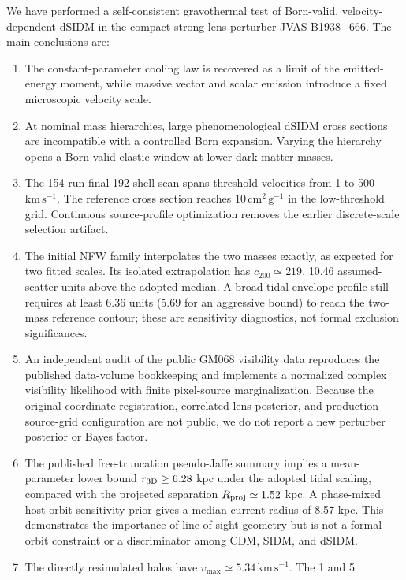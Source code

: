 \documentclass[12pt]{article}
\begin{document}
We have performed a self-consistent gravothermal test of Born-valid,
velocity-dependent dSIDM in the compact strong-lens perturber JVAS
B1938+666.  The main conclusions are:
\begin{enumerate}
  \item The constant-parameter cooling law is recovered as a limit of the
  emitted-energy moment, while massive vector and scalar emission introduce
  a fixed microscopic velocity scale.
  \item At nominal mass hierarchies, large phenomenological dSIDM cross
  sections are incompatible with a controlled Born expansion.  Varying the
  hierarchy opens a Born-valid elastic window at lower dark-matter masses.
  \item The 154-run final 192-shell scan spans threshold velocities from 1 to
  500 $\mathrm{km\,s^{-1}}$.  The reference cross section reaches
  $10\,\mathrm{cm^2\,g^{-1}}$ in the low-threshold grid.  Continuous
  source-profile optimization removes the earlier discrete-scale selection
  artifact.
  \item The initial NFW family interpolates the two masses exactly, as expected
  for two fitted scales.  Its isolated extrapolation has $c_{200}\simeq219$,
  10.46 assumed-scatter units above the adopted median.  A broad tidal-envelope
  profile still requires at least 6.36 units (5.69 for an aggressive bound) to
  reach the two-mass reference contour; these are sensitivity diagnostics,
  not formal exclusion significances.
  \item An independent audit of the public GM068 visibility data reproduces
  the published data-volume bookkeeping and implements a normalized complex
  visibility likelihood with finite pixel-source marginalization.  Because
  the original coordinate registration, correlated lens posterior, and
  production source-grid configuration are not public, we do not report a new
  perturber posterior or Bayes factor.
  \item The published free-truncation pseudo-Jaffe summary implies a
  mean-parameter lower bound $r_{\rm 3D}\geq6.28$ kpc under the adopted tidal
  scaling, compared with the projected separation $R_{\rm proj}\simeq1.52$
  kpc.  A phase-mixed host-orbit sensitivity prior gives a median current
  radius of 8.57 kpc.  This demonstrates the importance of line-of-sight
  geometry but is not a formal orbit constraint or a discriminator among CDM,
  SIDM, and dSIDM.
  \item The directly resimulated halos have
  $v_{\max}\simeq5.34\,\mathrm{km\,s^{-1}}$.  The 1 and 5

\end{enumerate}
\end{document}
